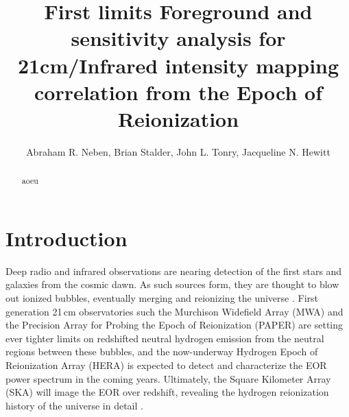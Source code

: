 \documentclass[preprint]{aastex}
\begin{document}
\title{First limits Foreground and sensitivity analysis for 21cm/Infrared intensity mapping correlation from the Epoch of Reionization}


\author{Abraham R. Neben,
Brian Stalder,
John L. Tonry,
Jacqueline N. Hewitt}




\begin{abstract}
aoeu
\end{abstract}


\section{Introduction}

Deep radio and infrared observations are nearing detection of the first stars and galaxies from the cosmic dawn. As such sources form, they are thought to blow out ionized bubbles, eventually merging and reionizing the universe \citep{FurlanettoReview,miguelreview,PritchardLoebReview}. First generation 21\,cm observatories such the Murchison Widefield Array (MWA) \citep{tingay13,mwascience} and the Precision Array for Probing the Epoch of Reionization (PAPER) \citep{parsons14,ali15,PoberPAPER64Heating,DannyMultiRedshift} are setting ever tighter limits on redshifted neutral hydrogen emission from the neutral regions between these bubbles, and the now-underway Hydrogen Epoch of Reionization Array (HERA) \citep{deboer16} is expected to detect and characterize the EOR power spectrum in the coming years. Ultimately, the Square Kilometer Array (SKA) will image the EOR over redshift, revealing the hydrogen reionization history of the universe in detail \citep{ska}. 
\end{document}
